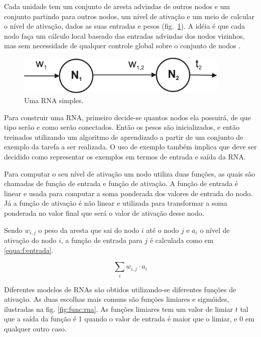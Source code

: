 Cada unidade tem um conjunto de aresta advindas de outros nodos e um conjunto partindo para outros nodos, um nível de ativação e um meio de calcular o nível de ativação, dados as suas entradas e pesos (fig.~\ref{fig:rnaSimples}). A idéia é que cada nodo faça um cálculo local baseado das entradas advindas dos nodos vizinhos, mas sem necessidade de qualquer controle global sobre o conjunto de nodos \cite{russel:modern}.

\begin{figure}[ht]
 \begin{center}
  \includegraphics[width=4in]{imagens/rnaSimples.png}
 \end{center}
 \caption{Uma RNA simples.}
 \label{fig:rnaSimples}
\end{figure}

Para construir uma RNA, primeiro decide-se quantos nodos ela possuirá, de que tipo serão e como serão conectados. Então os pesos são inicializados, e então treinados utilizando um algoritmo de aprendizado a partir de um conjunto de exemplo da tarefa a ser realizada. O uso de exemplo também implica que deve ser decidido como representar os exemplos em termos de entrada e saída da RNA.

Para computar o seu nível de ativação um nodo utiliza duas funções, as quais são chamadas de função de entrada e função de ativação. A função de entrada é linear e usada para computar a soma ponderada dos valores de entrada do nodo. Já a função de ativação é não linear e utilizada para transformar a soma ponderada no valor final que será o valor de ativação desse nodo.

Sendo $w_{i,j}$ o peso da aresta que sai do nodo $i$ até o nodo $j$ e $a_i$ o nível de ativação do nodo $i$, a função de entrada para $j$ é calculada como em \ref{equa:f:entrada}.

\begin{equation}
	\sum_{i} w_{i,j} \cdot a_i
	\label{equa:f:entrada}
\end{equation}

Diferentes modelos de RNAs são obtidos utilizando-se diferentes funções de ativação. As duas escolhas mais comuns são funções limiares e sigmóides, ilustradas na fig. \ref{fig:func:rna}. As funções limiares tem um valor de limiar $t$ tal que a saída da função é 1 quando o valor de entrada é maior que o limiar, e 0 em qualquer outro caso.

